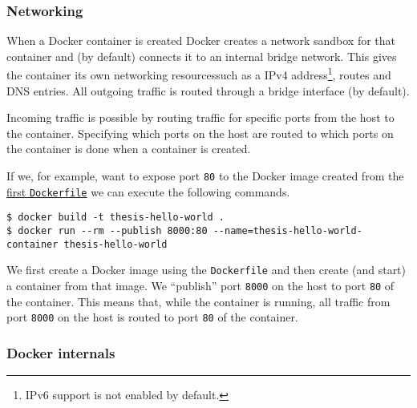 \subsubsection{Networking}

When a Docker container is created Docker creates a network sandbox for that container and (by default) connects it to an internal bridge network. This gives the container its own networking resourcessuch as a IPv4 address\footnote{IPv6 support is not enabled by default.}, routes and DNS entries. All outgoing traffic is routed through a bridge interface (by default).

\hfill

Incoming traffic is possible by routing traffic for specific ports from the host to the container.
Specifying which ports on the host are routed to which ports on the container is done when a container is created.

If we, for example, want to expose port \lstinline{80} to the Docker image created from the \hyperref[dockerfile:simple]{first \lstinline{Dockerfile}} we can execute the following commands.

\hfill

\begin{lstlisting}[caption={Creating a Docker container with exposed port},label={docker:publish},captionpos=b]
$ docker build -t thesis-hello-world .
$ docker run --rm --publish 8000:80 --name=thesis-hello-world-container thesis-hello-world
\end{lstlisting}

\hfill

We first create a Docker image using the \lstinline{Dockerfile} and then create (and start) a container from that image. We ``publish'' port \lstinline{8000} on the host to port \lstinline{80} of the container. This means that, while the container is running, all traffic from port \lstinline{8000} on the host is routed to port \lstinline{80} of the container.


\subsubsection{Docker internals}

